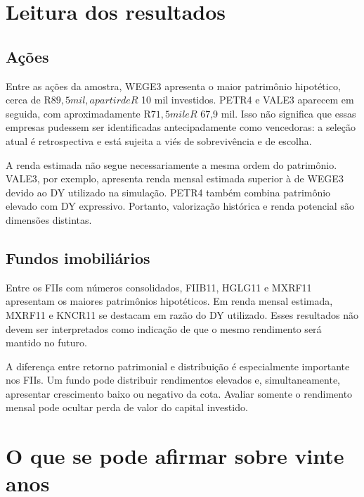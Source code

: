 \documentclass[11pt,a4paper]{article}
\begin{document}
\begin{longtable}{llrrrrrr}
\bottomrule

\end{longtable}

\normalsize

\section{Leitura dos resultados}

\subsection{Ações}

Entre as ações da amostra, WEGE3 apresenta o maior patrimônio hipotético, cerca de R$ 89,5 mil, a partir de R$ 10 mil investidos. PETR4 e VALE3 aparecem em seguida, com aproximadamente R$ 71,5 mil e R$ 67,9 mil. Isso não significa que essas empresas pudessem ser identificadas antecipadamente como vencedoras: a seleção atual é retrospectiva e está sujeita a viés de sobrevivência e de escolha.

A renda estimada não segue necessariamente a mesma ordem do patrimônio. VALE3, por exemplo, apresenta renda mensal estimada superior à de WEGE3 devido ao DY utilizado na simulação. PETR4 também combina patrimônio elevado com DY expressivo. Portanto, valorização histórica e renda potencial são dimensões distintas.

\subsection{Fundos imobiliários}

Entre os FIIs com números consolidados, FIIB11, HGLG11 e MXRF11 apresentam os maiores patrimônios hipotéticos. Em renda mensal estimada, MXRF11 e KNCR11 se destacam em razão do DY utilizado. Esses resultados não devem ser interpretados como indicação de que o mesmo rendimento será mantido no futuro.

A diferença entre retorno patrimonial e distribuição é especialmente importante nos FIIs. Um fundo pode distribuir rendimentos elevados e, simultaneamente, apresentar crescimento baixo ou negativo da cota. Avaliar somente o rendimento mensal pode ocultar perda de valor do capital investido.

\section{O que se pode afirmar sobre vinte anos}
\end{document}
